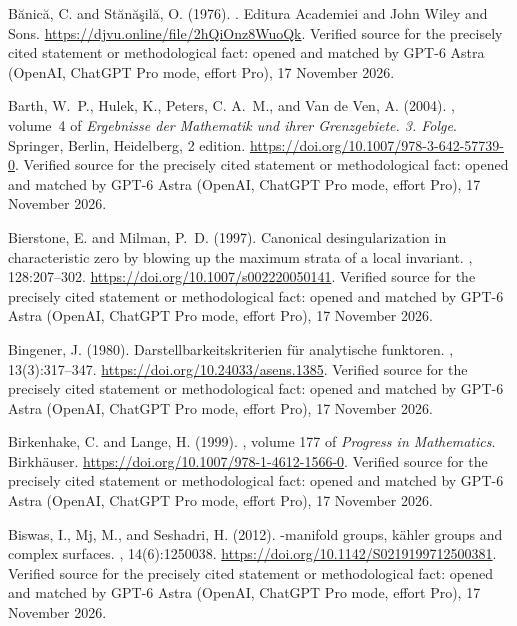 \begin{thebibliography}{}
B{\u a}nic{\u a}, C. and St{\u a}n{\u a}{\c s}il{\u a}, O. (1976).
.
\newblock Editura Academiei and John Wiley and Sons.
\newblock \url{https://djvu.online/file/2hQiOnz8WuoQk}. Verified source for the precisely cited statement or methodological fact: opened and matched by GPT-6 Astra (OpenAI, ChatGPT Pro mode, effort Pro), 17 November 2026.

Barth, W.~P., Hulek, K., Peters, C. A.~M., and {Van de Ven}, A. (2004).
, volume~4 of {\em Ergebnisse der
  Mathematik und ihrer Grenzgebiete. 3. Folge}.
\newblock Springer, Berlin, Heidelberg, 2 edition.
\newblock \url{https://doi.org/10.1007/978-3-642-57739-0}. Verified source for the precisely cited statement or methodological fact: opened and matched by GPT-6 Astra (OpenAI, ChatGPT Pro mode, effort Pro), 17 November 2026.

Bierstone, E. and Milman, P.~D. (1997).
\newblock Canonical desingularization in characteristic zero by blowing up the
  maximum strata of a local invariant.
, 128:207--302.
\newblock \url{https://doi.org/10.1007/s002220050141}. Verified source for the precisely cited statement or methodological fact: opened and matched by GPT-6 Astra (OpenAI, ChatGPT Pro mode, effort Pro), 17 November 2026.

Bingener, J. (1980).
\newblock Darstellbarkeitskriterien f\"ur analytische funktoren.
,
  13(3):317--347.
\newblock \url{https://doi.org/10.24033/asens.1385}. Verified source for the precisely cited statement or methodological fact: opened and matched by GPT-6 Astra (OpenAI, ChatGPT Pro mode, effort Pro), 17 November 2026.

Birkenhake, C. and Lange, H. (1999).
, volume 177 of {\em Progress in Mathematics}.
\newblock Birkh\"auser.
\newblock \url{https://doi.org/10.1007/978-1-4612-1566-0}. Verified source for the precisely cited statement or methodological fact: opened and matched by GPT-6 Astra (OpenAI, ChatGPT Pro mode, effort Pro), 17 November 2026.

Biswas, I., Mj, M., and Seshadri, H. (2012).
-manifold groups, k\"ahler groups and complex surfaces.
, 14(6):1250038.
\newblock \url{https://doi.org/10.1142/S0219199712500381}. Verified source for the precisely cited statement or methodological fact: opened and matched by GPT-6 Astra (OpenAI, ChatGPT Pro mode, effort Pro), 17 November 2026.


\end{thebibliography}

